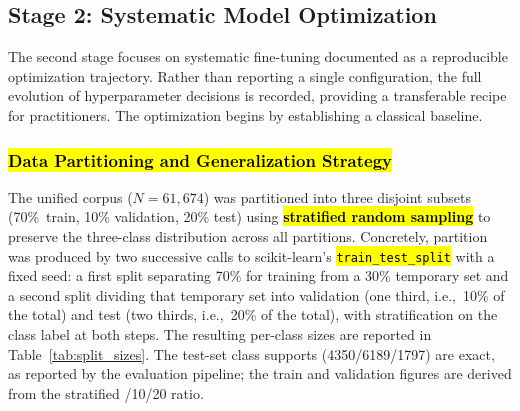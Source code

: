 \documentclass[informatics,article,accept,pdftex,moreauthors]{Definitions/mdpi}
\begin{document}
\subsection{Stage 2: Systematic Model Optimization}
The second stage focuses on systematic fine-tuning documented as a reproducible optimization trajectory. Rather than reporting a single configuration, the full evolution of hyperparameter decisions is recorded, %
providing a transferable recipe for practitioners. The optimization begins by establishing a classical baseline.

\subsubsection{\hl{Data Partitioning and Generalization Strategy}}\label{sec:partitioning}%

The unified corpus ($N=61{,}674$) was partitioned into three disjoint subsets (\mbox{70\% train}, 10\% validation, 20\% test) using \textbf{\hl{stratified random sampling}} to preserve the three-class distribution across all partitions. Concretely, partition was produced by two successive calls to scikit-learn's \texttt{\hl{train\_test\_split}} %
with a fixed seed: a first split separating 70\% for training from a 30\% temporary set and a second split dividing that temporary set into validation (one third, i.e.,\ 10\% of the total) and test (two thirds, i.e.,\ 20\% of the total), with stratification on the class label at both steps. The resulting per-class sizes are reported in Table~\ref{tab:split_sizes}. The test-set class supports (4350/6189/1797) are exact, as reported by the evaluation pipeline; the train and validation figures are derived from the stratified /10/20 ratio.
\end{document}
